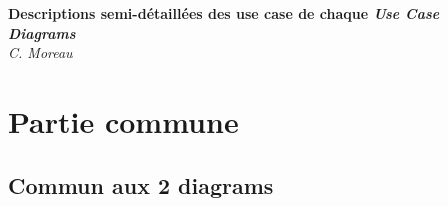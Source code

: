 \documentclass{article}
\begin{document}
\begin{titlepage}
   \begin{center}
      \Large\textbf{Descriptions semi-détaillées des use case de chaque \textit{Use Case Diagrams}}\\
      \large\textit{C. Moreau}
   \end{center}
\end{titlepage}
\tableofcontents
\newpage


\section{Partie commune}
\subsection{Commun aux 2 diagrams}
\end{document}
